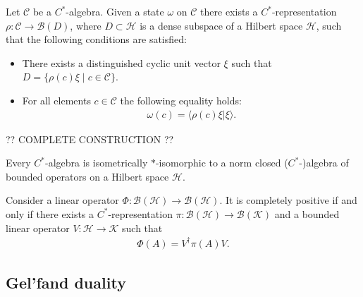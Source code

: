     \begin{construct}\label{operators:gns}
        Let $\mathcal{C}$ be a $C^*$-algebra. Given a state $\omega$ on $\mathcal{C}$ there exists a $C^*$-representation $\rho:\mathcal{C}\rightarrow\mathcal{B}(D)$, where $D\subset\mathcal{H}$ is a dense subspace of a Hilbert space $\mathcal{H}$, such that the following conditions are satisfied:
        \begin{itemize}
            \item There exists a distinguished cyclic unit vector $\xi$ such that $D = \{\rho(c)\xi\mid c\in\mathcal{C}\}$.
            \item For all elements $c\in\mathcal{C}$ the following equality holds:
                \begin{gather}
                    \omega(c) = \langle\rho(c)\xi|\xi\rangle.
                \end{gather}
        \end{itemize}

        ?? COMPLETE CONSTRUCTION ??
    \end{construct}

    \begin{theorem}
        Every $C^*$-algebra is isometrically $\ast$-isomorphic to a norm closed ($C^*$-)algebra of bounded operators on a Hilbert space $\mathcal{H}$.
    \end{theorem}

    \begin{theorem}[Stinespring]\label{operators:stinespring}
        Consider a linear operator $\Phi:\mathcal{B}(\mathcal{H})\rightarrow\mathcal{B}(\mathcal{H})$. It is completely positive if and only if there exists a $C^*$-representation $\pi:\mathcal{B}(\mathcal{H})\rightarrow\mathcal{B}(\mathcal{K})$ and a bounded linear operator $V:\mathcal{H}\rightarrow\mathcal{K}$ such that
        \begin{gather}
            \Phi(A) = V^\dag\pi(A)V.
        \end{gather}
    \end{theorem}

\subsection{Gel'fand duality}

